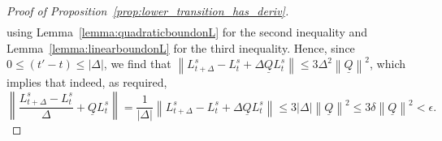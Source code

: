 \documentclass[10pt,a4paper]{paper}
\theoremstyle{definition}
\newcommand{\lrate}{\underline{Q}}
\newcommand{\norm}[1]{\left\lVert #1 \right\rVert}
\newcommand{\abs}[1]{\left\vert #1 \right\vert}
\begin{document}
\begin{proof}[Proof of Proposition~\ref{prop:lower_transition_has_deriv}]
\begin{align*}
\end{align*}
using Lemma~\ref{lemma:quadraticboundonL} for the second inequality and Lemma~\ref{lemma:linearboundonL} for the third inequality. Hence, since $0\leq(t'-t)\leq\abs{\Delta}$, we find that $\norm{L_{t+\Delta}^s-L_t^s+\Delta\lrate L_t^s}\leq3\Delta^2\norm{\lrate}^2$, which implies that indeed, as required,
\begin{equation*}
\norm{\frac{L_{t+\Delta}^s-L_t^s}{\Delta}+\lrate L_t^s}
=\frac{1}{\abs{\Delta}}\norm{L_{t+\Delta}^s-L_t^s+\Delta\lrate L_t^s}
\leq3\abs{\Delta}\norm{\lrate}^2
\leq3\delta\norm{\lrate}^2
<\epsilon.
\end{equation*}

\end{proof}
\end{document}
